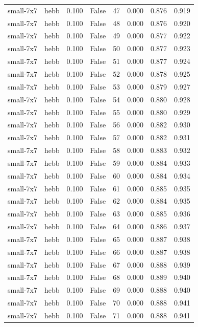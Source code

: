 \begin{tabular}{llrrrrrr}
small-7x7 & hebb & 0.100 & False & 47 & 0.000 & 0.876 & 0.919 \\
small-7x7 & hebb & 0.100 & False & 48 & 0.000 & 0.876 & 0.920 \\
small-7x7 & hebb & 0.100 & False & 49 & 0.000 & 0.877 & 0.922 \\
small-7x7 & hebb & 0.100 & False & 50 & 0.000 & 0.877 & 0.923 \\
small-7x7 & hebb & 0.100 & False & 51 & 0.000 & 0.877 & 0.924 \\
small-7x7 & hebb & 0.100 & False & 52 & 0.000 & 0.878 & 0.925 \\
small-7x7 & hebb & 0.100 & False & 53 & 0.000 & 0.879 & 0.927 \\
small-7x7 & hebb & 0.100 & False & 54 & 0.000 & 0.880 & 0.928 \\
small-7x7 & hebb & 0.100 & False & 55 & 0.000 & 0.880 & 0.929 \\
small-7x7 & hebb & 0.100 & False & 56 & 0.000 & 0.882 & 0.930 \\
small-7x7 & hebb & 0.100 & False & 57 & 0.000 & 0.882 & 0.931 \\
small-7x7 & hebb & 0.100 & False & 58 & 0.000 & 0.883 & 0.932 \\
small-7x7 & hebb & 0.100 & False & 59 & 0.000 & 0.884 & 0.933 \\
small-7x7 & hebb & 0.100 & False & 60 & 0.000 & 0.884 & 0.934 \\
small-7x7 & hebb & 0.100 & False & 61 & 0.000 & 0.885 & 0.935 \\
small-7x7 & hebb & 0.100 & False & 62 & 0.000 & 0.884 & 0.935 \\
small-7x7 & hebb & 0.100 & False & 63 & 0.000 & 0.885 & 0.936 \\
small-7x7 & hebb & 0.100 & False & 64 & 0.000 & 0.886 & 0.937 \\
small-7x7 & hebb & 0.100 & False & 65 & 0.000 & 0.887 & 0.938 \\
small-7x7 & hebb & 0.100 & False & 66 & 0.000 & 0.887 & 0.938 \\
small-7x7 & hebb & 0.100 & False & 67 & 0.000 & 0.888 & 0.939 \\
small-7x7 & hebb & 0.100 & False & 68 & 0.000 & 0.889 & 0.940 \\
small-7x7 & hebb & 0.100 & False & 69 & 0.000 & 0.888 & 0.940 \\
small-7x7 & hebb & 0.100 & False & 70 & 0.000 & 0.888 & 0.941 \\
small-7x7 & hebb & 0.100 & False & 71 & 0.000 & 0.888 & 0.941 \\

\end{tabular}
